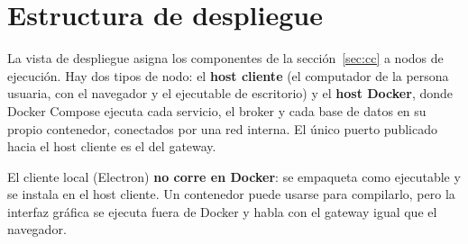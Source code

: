 \seccionnueva
\section{Estructura de despliegue}
\label{sec:despliegue}

La vista de despliegue asigna los componentes de la sección~\ref{sec:cc} a nodos de ejecución.
Hay dos tipos de nodo: el \textbf{host cliente} (el computador de la persona usuaria, con el
navegador y el ejecutable de escritorio) y el \textbf{host Docker}, donde Docker Compose ejecuta
cada servicio, el broker y cada base de datos en su propio contenedor, conectados por una red
interna. El único puerto publicado hacia el host cliente es el del gateway.

\begin{nota}
El cliente local (Electron) \textbf{no corre en Docker}: se empaqueta como ejecutable y se
instala en el host cliente. Un contenedor puede usarse para compilarlo, pero la interfaz gráfica
se ejecuta fuera de Docker y habla con el gateway igual que el navegador.
\end{nota}

